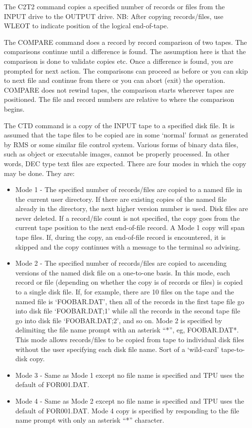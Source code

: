 The C2T2 command copies a specified number of records or files from the INPUT
drive to the OUTPUT drive.
NB: After copying records/files, use WLEOT to indicate position of the logical
end-of-tape.

The COMPARE command does a record by record comparison of two tapes.
The comparisons continue until a difference is found.
The assumption here is that the comparison is done to validate copies etc.
Once a difference is found, you are prompted for next action.
The comparisons can proceed as before or you can skip to next file and continue
from there or you can abort (exit) the operation.
COMPARE does not rewind tapes, the comparison starts wherever tapes are
positioned.
The file and record numbers are relative to where the comparison begins.

The CTD command is a copy of the INPUT tape to a specified disk file.
It is assumed that the tape files to be copied are in some `normal' format as
generated by RMS or some similar file control system.
Various forms of binary data files, such as object or executable images, cannot
be properly processed.
In other words, DEC type text files are expected.
There are four modes in which the copy may be done.
They are:

\begin{itemize}
\item
Mode 1 - The specified number of records/files are copied to a named file in the
current user directory.
If there are existing copies of the named file already in the directory, the
next higher version number is used.
Disk files are never deleted.
If a record/file count is not specified, the copy goes from the current tape
position to the next end-of-file record.
A Mode 1 copy will span tape files.
If, during the copy, an end-of-file record is encountered, it is skipped and the
copy continues with a message to the terminal so advising.

\item
Mode 2 - The specified number of records/files are copied to ascending versions
of the named disk file on a one-to-one basis.
In this mode, each record or file (depending on whether the copy is of records
or files) is copied to a single disk file.
If, for example, there are 10 files on the tape and the named file is
`FOOBAR.DAT', then all of the records in the first tape file go into disk file
`FOOBAR.DAT;1' while all the records in the second tape file go into disk file
`FOOBAR.DAT;2', and so on.
Mode 2 is specified by delimiting the file name prompt with an asterisk ``*'',
eg, FOOBAR.DAT*.
This mode allows records/files to be copied from tape to individual disk files
without the user specifying each disk file name.
Sort of a `wild-card' tape-to-disk copy.

\item
Mode 3 - Same as Mode 1 except no file name is specified and TPU uses the
default of FOR001.DAT.

\item
Mode 4 - Same as Mode 2 except no file name is specified and TPU uses the
default of FOR001.DAT.
Mode 4 copy is specified by responding to the file name prompt with only an
asterisk ``*'' character.
\end{itemize}


